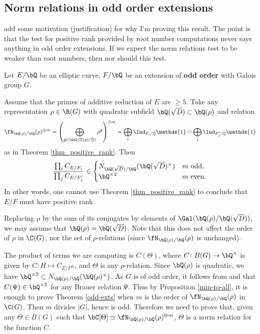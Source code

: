\subsection{Norm relations in odd order extensions}

{\color{red} add some motivation (justification) for why I'm proving this result. The point is that the test for positive rank provided by root number computations never says anything in odd order extensions. If we expect the norm relations test to be weaker than root numbers, then nor should this test.}

\begin{thm}\label{odd-exts}
 Let $E / \bQ$ be an elliptic curve, $F / \bQ$ be an extension of \textbf{odd order} with Galois group $G$. 
 
Assume that the primes of additive reduction of $E$ are $\geq 5$. 
Take any representation $\rho \in \R(G)$ with quadratic subfield $\bQ(\sqrt{D}) \subset \bQ(\rho)$ and relation
\begin{equation*}\label{odd-exp} \repnorm{\rho}^{\oplus m} =
 \left(\bigoplus_{\mathfrak{g}\in\Gal(\QQ(\rho)/\QQ)}\rho^{\mathfrak{g}}\right)^{\oplus m }=\bigoplus_i\Ind_{F_i/\QQ}\mathds{1}\ominus\bigoplus_j\Ind_{F'_j/\QQ}\mathds{1}
\end{equation*}
 as in Theorem \ref{thm_positive_rank}. Then
 \[ \frac{\prod_i C_{E/F_i}}{\prod_j C_{E/F_j'}}  \in 
    \begin{cases}
        N_{\bQ(\sqrt{D}) / \bQ}(\bQ(\sqrt{D})^{\times}) & m \ \text{odd}, \\
        \bQ^{\times 2} & m \ \text{even}.
    \end{cases} \] 
    In other words, one cannot use Theorem \ref{thm_positive_rank} to conclude that $E / F$ must have positive rank. 
\end{thm}

Replacing $\rho$ by the sum of its conjugates by elements of $ \Gal(\bQ(\rho) / \bQ(\sqrt{D}))$, we may assume that $\bQ(\rho) = \bQ(\sqrt{D})$. Note that this does not affect the order of $\rho$ in $\C(G)$, nor the set of $\rho$-relations (since $\repnorm{\rho}$ is unchanged). 

The product of terms we are computing is $C(\Theta)$, where $C \colon B(G) \to \bQ^{\times}$ is given by $C \colon H \mapsto C_{E / F^H}$, and $\Theta$ is any $\rho$-relation. Since $\bQ(\rho)$ is quadratic, we have $\bQ^{\times 2} \subset \fieldnorm{\rho}$. As $G$ is of odd order, it follows from \cite[Theorem 2.47]{reg-const} and \cite[Theorem 3.2  (Tam)]{reg-const} that $C(\Psi) \in \bQ^{\times 2}$ for any Brauer relation $\Psi$. Thus by Proposition \ref{min-to-all}, it is enough to prove Theorem \ref{odd-exts} when $m$ is the order of $\repnorm{\rho}$ in $\C(G)$. Then $m$ divides $|G|$, hence is odd. Therefore we need to prove that, given any $
\Theta \in B(G)$ such that $\bC[\Theta] \simeq \repnorm{\rho}^{\oplus m}$, $\Theta$ is a norm relation for the function $C$. 

